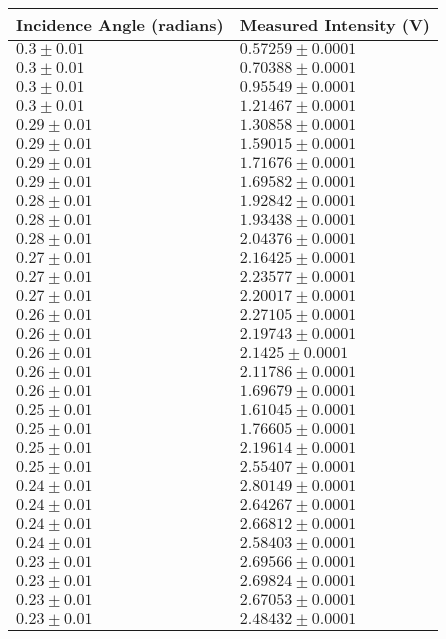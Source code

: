 \begin{tabular}{| p{} | p{} |}
\hline
Incidence Angle (radians) & Measured Intensity (V)\\
\hline
$0.3 \pm 0.01$ & $0.57259 \pm 0.0001$\\
$0.3 \pm 0.01$ & $0.70388 \pm 0.0001$\\
$0.3 \pm 0.01$ & $0.95549 \pm 0.0001$\\
$0.3 \pm 0.01$ & $1.21467 \pm 0.0001$\\
$0.29 \pm 0.01$ & $1.30858 \pm 0.0001$\\
$0.29 \pm 0.01$ & $1.59015 \pm 0.0001$\\
$0.29 \pm 0.01$ & $1.71676 \pm 0.0001$\\
$0.29 \pm 0.01$ & $1.69582 \pm 0.0001$\\
$0.28 \pm 0.01$ & $1.92842 \pm 0.0001$\\
$0.28 \pm 0.01$ & $1.93438 \pm 0.0001$\\
$0.28 \pm 0.01$ & $2.04376 \pm 0.0001$\\
$0.27 \pm 0.01$ & $2.16425 \pm 0.0001$\\
$0.27 \pm 0.01$ & $2.23577 \pm 0.0001$\\
$0.27 \pm 0.01$ & $2.20017 \pm 0.0001$\\
$0.26 \pm 0.01$ & $2.27105 \pm 0.0001$\\
$0.26 \pm 0.01$ & $2.19743 \pm 0.0001$\\
$0.26 \pm 0.01$ & $2.1425 \pm 0.0001$\\
$0.26 \pm 0.01$ & $2.11786 \pm 0.0001$\\
$0.26 \pm 0.01$ & $1.69679 \pm 0.0001$\\
$0.25 \pm 0.01$ & $1.61045 \pm 0.0001$\\
$0.25 \pm 0.01$ & $1.76605 \pm 0.0001$\\
$0.25 \pm 0.01$ & $2.19614 \pm 0.0001$\\
$0.25 \pm 0.01$ & $2.55407 \pm 0.0001$\\
$0.24 \pm 0.01$ & $2.80149 \pm 0.0001$\\
$0.24 \pm 0.01$ & $2.64267 \pm 0.0001$\\
$0.24 \pm 0.01$ & $2.66812 \pm 0.0001$\\
$0.24 \pm 0.01$ & $2.58403 \pm 0.0001$\\
$0.23 \pm 0.01$ & $2.69566 \pm 0.0001$\\
$0.23 \pm 0.01$ & $2.69824 \pm 0.0001$\\
$0.23 \pm 0.01$ & $2.67053 \pm 0.0001$\\
$0.23 \pm 0.01$ & $2.48432 \pm 0.0001$\\
\hline
\end{tabular}\hfill
